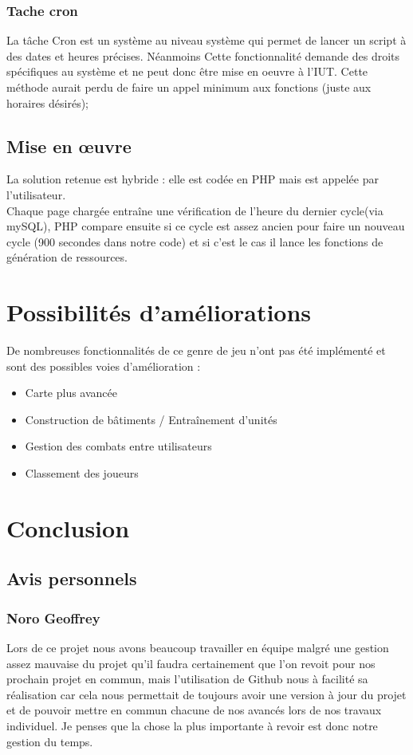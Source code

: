 \documentclass[11pt,a4paper]{article}
\begin{document}
\subsubsection{Tache cron}
La tâche Cron est un système au niveau système qui permet de lancer un script à des dates et heures précises. Néanmoins Cette fonctionnalité demande des droits spécifiques au système et ne peut donc être mise en oeuvre à l'IUT. Cette méthode aurait perdu de faire un appel minimum aux fonctions (juste aux horaires désirés);
\subsection{Mise en œuvre}
La solution retenue est hybride : elle est codée en PHP mais est appelée par l'utilisateur. \\
Chaque page chargée entraîne une vérification de l'heure du dernier cycle(via mySQL), PHP compare ensuite si ce cycle est assez ancien pour faire un nouveau cycle (900 secondes dans notre code) et si c'est le cas il lance les fonctions de génération de ressources.

\newpage\section{Possibilités d'améliorations}
De nombreuses fonctionnalités de ce genre de jeu n'ont pas été implémenté et sont des possibles voies d'amélioration :\\
\begin{itemize}
\item Carte plus avancée
\item Construction de bâtiments / Entraînement d'unités
\item Gestion des combats entre utilisateurs
\item Classement des joueurs
\end{itemize}
\section{Conclusion}
\subsection{Avis personnels}
\subsubsection{Noro Geoffrey}
Lors de ce projet nous avons beaucoup travailler en équipe malgré une gestion assez mauvaise du projet qu'il faudra certainement que l'on revoit pour nos prochain projet en commun, mais l'utilisation de Github nous à facilité sa réalisation car cela nous permettait de toujours avoir une version à jour du projet et de pouvoir mettre en commun chacune de nos avancés lors de nos travaux individuel. Je penses que la chose la plus importante à revoir est donc notre gestion du temps.
\end{document}
